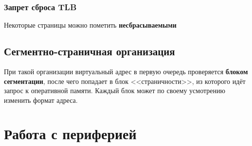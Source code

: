 \subsubsection*{Запрет сброса TLB}

Некоторые страницы можно пометить \textbf{несбрасываемыми}

\subsection{Сегментно-страничная организация}

При такой организации виртуальный адрес в первую очередь проверяется \textbf{блоком сегментации}, после чего попадает в блок <<страничности>>, из которого идёт запрос к оперативной памяти. Каждый блок может по своему усмотрению изменить формат адреса.

\section{Работа с периферией}

